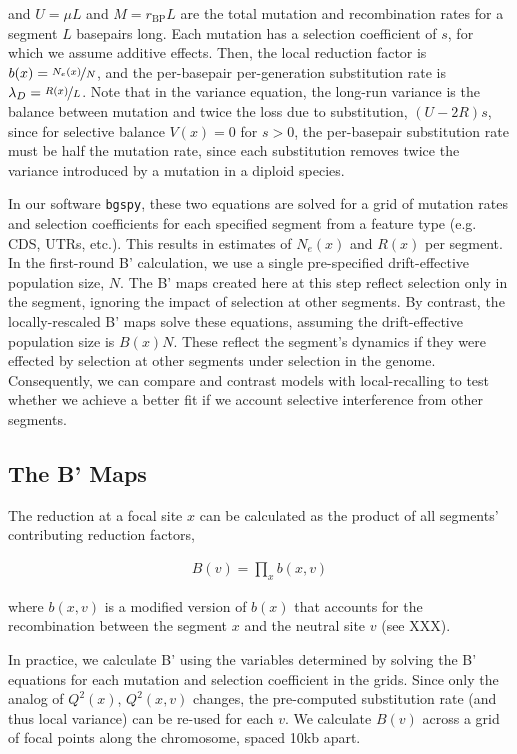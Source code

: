 \documentclass[11pt]{article}
\begin{document}
and $U = \mu L$ and $M = r_\text{BP} L$ are the total mutation and
recombination rates for a segment $L$ basepairs long. Each mutation has a
selection coefficient of $s$, for which we assume additive effects. Then, the
local reduction factor is $b(x) = \nicefrac{N_e(x)}{N}$, and the per-basepair
per-generation substitution rate is $\lambda_D = \nicefrac{R(x)}{L}$. Note that
in the variance equation, the long-run variance is the balance between mutation
and twice the loss due to substitution, $(U-2R)s$, since for selective balance
$V(x) = 0$ for $s>0$, the per-basepair substitution rate must be half the mutation rate,
since each substitution removes twice the variance introduced by a mutation in
a diploid species.

In our software \texttt{bgspy}, these two equations are solved for a grid of
mutation rates and selection coefficients for each specified segment from a
feature type (e.g. CDS, UTRs, etc.). This results in estimates of $N_e(x)$ and
$R(x)$ per segment. In the first-round B' calculation, we use a single
pre-specified drift-effective population size, $N$. The B' maps created here at
this step reflect selection only in the segment, ignoring the impact of
selection at other segments. By contrast, the locally-rescaled B' maps solve
these equations, assuming the drift-effective population size is $B(x)N$. These
reflect the segment's dynamics if they were effected by selection at other
segments under selection in the genome. Consequently, we can compare and
contrast models with local-recalling to test whether we achieve a better fit if
we account selective interference from other segments.

\subsection*{The B' Maps}

The reduction at a focal site $x$ can be calculated as the product of all
segments' contributing reduction factors, 

\begin{align}
  B(v) = \prod_x b(x,v)
\end{align}

where $b(x, v)$ is a modified version of $b(x)$ that accounts for the
recombination between the segment $x$ and the neutral site $v$ (see XXX).

In practice, we calculate B' using the variables determined by solving the B'
equations for each mutation and selection coefficient in the grids. Since only
the analog of $Q^2(x)$, $Q^2(x, v)$ changes, the pre-computed substitution rate
(and thus local variance) can be re-used for each $v$. We calculate $B(v)$
across a grid of focal points along the chromosome, spaced 10kb apart.
\end{document}
